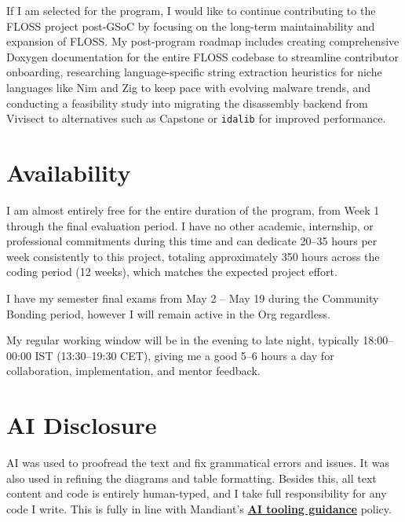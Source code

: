 \documentclass[12pt]{article}
\begin{document}
If I am selected for the program, I would like to continue contributing to the FLOSS project post-GSoC by focusing on the long-term maintainability and expansion of FLOSS. My post-program roadmap includes creating comprehensive Doxygen documentation for the entire FLOSS codebase to streamline contributor onboarding, researching language-specific string extraction heuristics for niche languages like Nim and Zig to keep pace with evolving malware trends, and conducting a feasibility study into migrating the disassembly backend from Vivisect to alternatives such as Capstone or \texttt{idalib} for improved performance.

\section*{Availability}
{}

I am almost entirely free for the entire duration of the program, from Week 1 through the final evaluation period. I have no other academic, internship, or professional commitments during this time and can dedicate 20--35 hours per week consistently to this project, totaling approximately 350 hours across the coding period (12 weeks), which matches the expected project effort.

I have my semester final exams from May 2 -- May 19 during the Community Bonding period, however I will remain active in the Org regardless.

My regular working window will be in the evening to late night, typically 18:00--00:00 IST (13:30--19:30 CET), giving me a good 5--6 hours a day for collaboration, implementation, and mentor feedback.

\section*{AI Disclosure}
{}

AI was used to proofread the text and fix grammatical errors and issues. It was also used in refining the diagrams and table formatting.
Besides this, all text content and code is entirely human-typed, and I take full responsibility for any code I write.
This is fully in line with Mandiant's \href{https://github.com/mandiant/flare-gsoc/blob/2026/doc/contributor-guidance.md#ai-tooling-guidance}{\textbf{AI tooling guidance}} policy.
\end{document}

